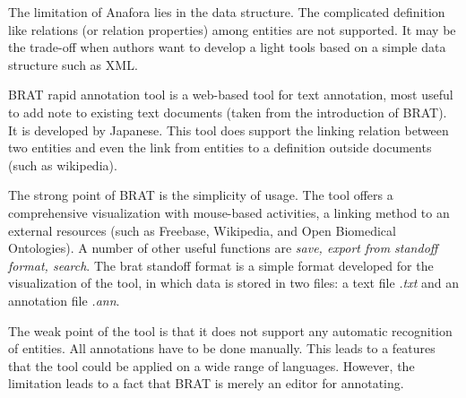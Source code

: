 The limitation of Anafora lies in the data structure. The complicated definition like relations (or relation properties) 
among entities are not supported. It may be the trade-off when authors want to develop a light tools based on a simple
data structure such as XML.


BRAT rapid annotation tool is a web-based tool for text annotation, most useful to add note to existing text documents 
(taken from the introduction of BRAT). It is developed by Japanese. This tool does support the linking relation between 
two entities and even the link 
from entities to a definition outside documents (such as wikipedia).

The strong point of BRAT is the simplicity of usage. The tool offers a comprehensive visualization with mouse-based 
activities, a linking method to an external resources (such as Freebase, Wikipedia, and Open Biomedical Ontologies). A number 
of other useful functions are \textit{save, export from standoff format, search}. The brat standoff format is a simple 
format developed for the visualization of the tool, in which data is stored in two files: a text file \textit{.txt} and an
annotation file \textit{.ann}.

The weak point of the tool is that it does not support any automatic recognition of entities. All annotations have to be
done manually. This leads to a features that the tool could be applied on a wide range of languages. However, the 
limitation leads to a fact that BRAT is merely an editor for annotating.

